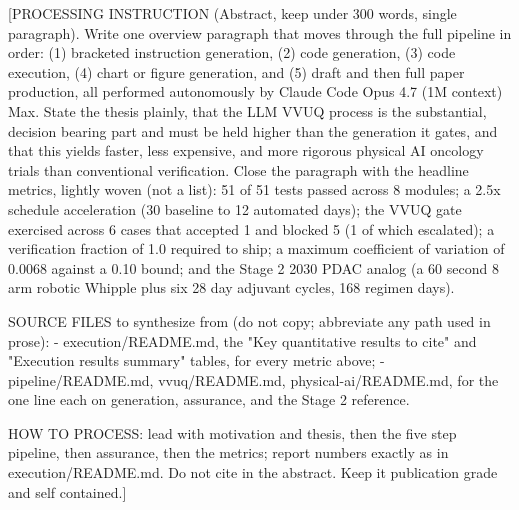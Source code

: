 
[PROCESSING INSTRUCTION (Abstract, keep under 300 words, single
paragraph). Write one overview paragraph that moves through the full
pipeline in order: (1) bracketed instruction generation, (2) code
generation, (3) code execution, (4) chart or figure generation, and (5)
draft and then full paper production, all performed autonomously by
Claude Code Opus 4.7 (1M context) Max. State the thesis plainly, that
the LLM VVUQ process is the substantial, decision bearing part and must
be held higher than the generation it gates, and that this yields
faster, less expensive, and more rigorous physical AI oncology trials
than conventional verification. Close the paragraph with the headline
metrics, lightly woven (not a list): 51 of 51 tests passed across 8
modules; a 2.5x schedule acceleration (30 baseline to 12 automated
days); the VVUQ gate exercised across 6 cases that accepted 1 and
blocked 5 (1 of which escalated); a verification fraction of 1.0
required to ship; a maximum coefficient of variation of 0.0068 against a
0.10 bound; and the Stage 2 2030 PDAC analog (a 60 second 8 arm robotic
Whipple plus six 28 day adjuvant cycles, 168 regimen days).

SOURCE FILES to synthesize from (do not copy; abbreviate any path used
in prose):
- execution/README.md, the "Key quantitative results to cite" and
  "Execution results summary" tables, for every metric above;
- pipeline/README.md, vvuq/README.md, physical-ai/README.md, for the
  one line each on generation, assurance, and the Stage 2 reference.

HOW TO PROCESS: lead with motivation and thesis, then the five step
pipeline, then assurance, then the metrics; report numbers exactly as in
execution/README.md. Do not cite in the abstract. Keep it publication
grade and self contained.]
